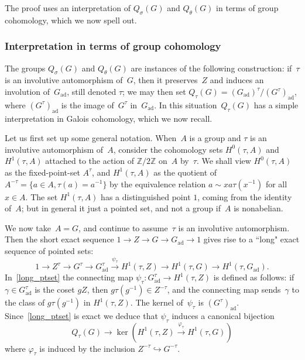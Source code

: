 \documentclass[10pt,leqno]{article}
\newcommand{\ad}{\mathrm{ad}}
\newcommand{\Gad}{G_\mathrm{ad}}
\newcommand{\Z}{\mathbb Z}
\begin{document}
The proof uses an interpretation of $Q_\sigma(G)$ and $Q_\theta(G)$ in terms of group cohomology, which we now spell out. 

\subsubsection{Interpretation in terms of group cohomology}

The groups $Q_{\sigma}(G)$ and $Q_{\theta}(G)$ are instances of the following construction: if~$\tau$ is an involutive automorphism of~$G$, then it preserves~$Z$ and induces an involution of~$\Gad$, still denoted $\tau$; we may then set $Q_{\tau}(G)=(\Gad)^{\tau}/(G^{\tau})_{\ad}$, where $(G^{\tau})_{\ad}$ is the image of~$G^{\tau}$ in~$\Gad$. In this situation~$Q_{\tau}(G)$ has a simple interpretation in Galois cohomology, which we now recall. 

Let us first set up some general notation. When~$A$ is a group and $\tau$ is an involutive automorphism of~$A$, consider the cohomology sets $H^0(\tau, A)$ and $H^1(\tau, A)$ attached to the action of $\Z/2\Z$ on~$A$ by~$\tau$. We shall view   $H^0(\tau, A)$ as the fixed-point-set $A^{\tau}$, and $H^1(\tau,A)$ as the quotient of $A^{-\tau} = \{ a \in A, \tau(a)=a^{-1}\}$ by the equivalence relation $a \sim x a \tau(x^{-1})$ for all $x \in A$. The set $H^1(\tau, A)$ has a distinguished point $1$, coming from the identity of~$A$; but in general it just a pointed set, and not a group if~$A$ is nonabelian. 


We now take~$A=G$, and continue to assume~$\tau$ is an involutive automorphism. Then the short exact sequence $1\rightarrow Z \rightarrow G \rightarrow \Gad\rightarrow 1$ 
gives rise to a ``long" exact sequence of pointed sets:
\begin{equation} \label{long_ptset}
1\rightarrow Z^\tau \rightarrow G^\tau \rightarrow \Gad^{\tau} \overset{\psi_\tau}{\longrightarrow} H^1(\tau,Z)\to H^1(\tau,G)\rightarrow H^1(\tau,\Gad).
\end{equation}
In~\eqref{long_ptset} the connecting map  $ \psi_\tau\colon \Gad^{\tau} \rightarrow H^1(\tau,Z)$ is defined as follows: if $\gamma \in \Gad^{\tau}$ is the coset $gZ$, then $g\tau(g^{-1}) \in Z^{-\tau}$, and the connecting map sends~$\gamma$ to the class of $g \tau(g^{-1})$ in $H^1(\tau, Z)$. The kernel of~$\psi_\tau$ is $(G^\tau)_{\ad}$. Since~\eqref{long_ptset} is exact we deduce that $\psi_\tau$ induces a canonical  bijection
\begin{equation} \label{interp_q_cohomology} Q_{\tau}(G) \to  \ker\left(H^1(\tau,Z)\overset{\varphi_\tau}{\longrightarrow} H^1(\tau,G)\right)\end{equation}
where $\varphi_\tau$ is induced by the inclusion $Z^{-\tau} \hookrightarrow G^{-\tau}$. 
\end{document}
